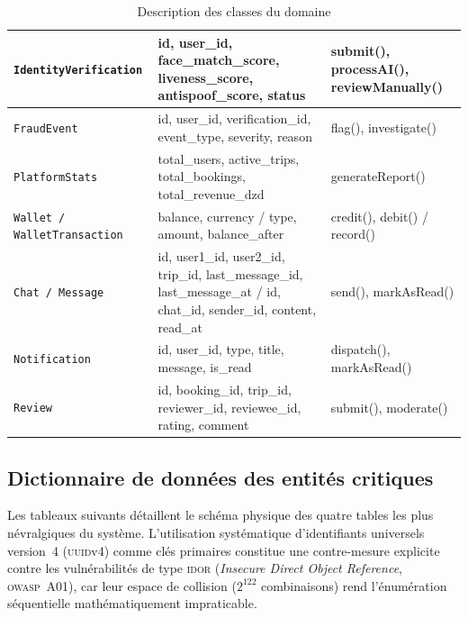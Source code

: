 \begin{landscape}
\begin{table}[H]
\begin{tabularx}{\linewidth}{|l|X|X|}
\hline
\texttt{IdentityVerification} & id, user\_id, face\_match\_score, liveness\_score, antispoof\_score, status & submit(), processAI(), reviewManually() \\
\hline
\texttt{FraudEvent} & id, user\_id, verification\_id, event\_type, severity, reason & flag(), investigate() \\
\hline
\texttt{PlatformStats} & total\_users, active\_trips, total\_bookings, total\_revenue\_dzd & generateReport() \\
\hline
\texttt{Wallet / WalletTransaction} & balance, currency / type, amount, balance\_after & credit(), debit() / record() \\
\hline
\texttt{Chat / Message} & id, user1\_id, user2\_id, trip\_id, last\_message\_id, last\_message\_at / id, chat\_id, sender\_id, content, read\_at & send(), markAsRead() \\
\hline
\texttt{Notification} & id, user\_id, type, title, message, is\_read & dispatch(), markAsRead() \\
\hline
\texttt{Review} & id, booking\_id, trip\_id, reviewer\_id, reviewee\_id, rating, comment & submit(), moderate() \\

\hline
\end{tabularx}
  \caption{Description des classes du domaine}
  \label{tab:classes}
\end{table}
\end{landscape}

\subsection{Dictionnaire de données des entités critiques}
\label{sec:entites-critiques}

Les tableaux suivants détaillent le schéma physique des quatre tables les plus névralgiques du système. L'utilisation systématique d'identifiants universels version~4 (\textsc{uuid}v4) comme clés primaires constitue une contre-mesure explicite contre les vulnérabilités de type \textsc{idor} (\textit{Insecure Direct Object Reference}, \textsc{owasp}~A01), car leur espace de collision ($2^{122}$ combinaisons) rend l'énumération séquentielle mathématiquement impraticable.

